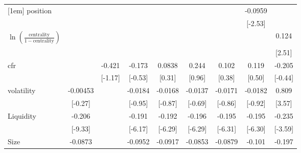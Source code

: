 {\begin{tabular}{l*{8}{c}}
[1em]
position            &                     &                     &                     &                     &                     &                     &     -0.0959\sym{*}  &                     \\
                    &                     &                     &                     &                     &                     &                     &     [-2.53]         &                     \\
[1em]
 $ \ln(\frac{\text{centrality}}{1-\text{centrality}}) $&                     &                     &                     &                     &                     &                     &                     &       0.124\sym{*}  \\
                    &                     &                     &                     &                     &                     &                     &                     &      [2.51]         \\
[1em]
cfr                 &                     &      -0.421         &      -0.173         &      0.0838         &       0.244         &       0.102         &       0.119         &      -0.205         \\
                    &                     &     [-1.17]         &     [-0.53]         &      [0.31]         &      [0.96]         &      [0.38]         &      [0.50]         &     [-0.44]         \\
[1em]
volatility          &    -0.00453         &                     &     -0.0184         &     -0.0168         &     -0.0137         &     -0.0171         &     -0.0182         &       0.809\sym{***}\\
                    &     [-0.27]         &                     &     [-0.95]         &     [-0.87]         &     [-0.69]         &     [-0.86]         &     [-0.92]         &      [3.57]         \\
[1em]
Liquidity           &      -0.206\sym{***}&                     &      -0.191\sym{***}&      -0.192\sym{***}&      -0.196\sym{***}&      -0.195\sym{***}&      -0.195\sym{***}&      -0.235\sym{***}\\
                    &     [-9.33]         &                     &     [-6.17]         &     [-6.29]         &     [-6.29]         &     [-6.31]         &     [-6.30]         &     [-3.59]         \\
[1em]
Size                &     -0.0873\sym{**} &                     &     -0.0952\sym{*}  &     -0.0917\sym{*}  &     -0.0853\sym{*}  &     -0.0879\sym{*}  &      -0.101\sym{*}  &      -0.197         \\

\end{tabular}}
